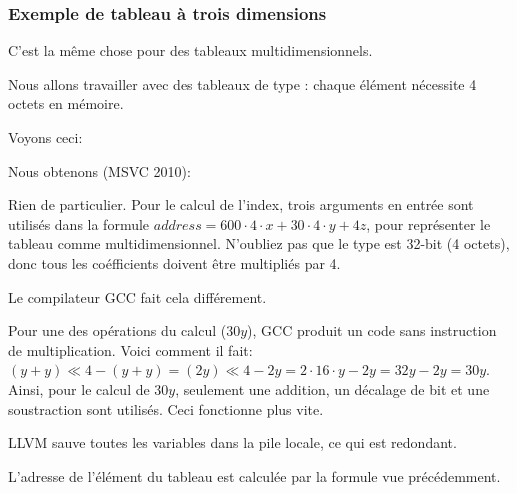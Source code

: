 \subsubsection{Exemple de tableau à trois dimensions}

C'est la même chose pour des tableaux multidimensionnels.

Nous allons travailler avec des tableaux de type \Tint: chaque élément nécessite
4 octets en mémoire.

Voyons ceci:




Nous obtenons (MSVC 2010):



Rien de particulier. Pour le calcul de l'index, trois arguments en entrée sont utilisés
dans la formule $address=600 \cdot 4 \cdot x + 30 \cdot 4 \cdot y + 4z$, pour représenter
le tableau comme multidimensionnel.
N'oubliez pas que le type \Tint est 32-bit (4 octets), donc tous les coéfficients
doivent être multipliés par 4.



Le compilateur GCC fait cela différement.

Pour une des opérations du calcul ($30y$), GCC produit un code sans instruction de
multiplication. Voici comment il fait:
$(y+y) \ll 4 - (y+y) = (2y) \ll 4 - 2y = 2 \cdot 16 \cdot y - 2y = 32y - 2y = 30y$. 
Ainsi, pour le calcul de $30y$, seulement une addition, un décalage de bit et une
soustraction sont utilisés.
Ceci fonctionne plus vite.




LLVM \NonOptimizing sauve toutes les variables dans la pile locale, ce qui est redondant.

L'adresse de l'élément du tableau est calculée par la formule vue précédemment.




